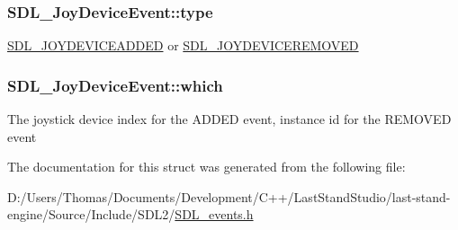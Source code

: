 \subsubsection[{type}]{ S\+D\+L\+\_\+\+Joy\+Device\+Event\+::type}\label{structSDL__JoyDeviceEvent_a51f060ba1dd5669b458e9c97aece667e}
\hyperlink{SDL__events_8h_a3b589e89be6b35c02e0dd34a55f3fccaa0500c4e830a1822e6d0a90294c3f1393}{S\+D\+L\+\_\+\+J\+O\+Y\+D\+E\+V\+I\+C\+E\+A\+D\+D\+E\+D} or \hyperlink{SDL__events_8h_a3b589e89be6b35c02e0dd34a55f3fccaa4e2d7a1067dc56abeee393d46309ecd0}{S\+D\+L\+\_\+\+J\+O\+Y\+D\+E\+V\+I\+C\+E\+R\+E\+M\+O\+V\+E\+D} \hypertarget{structSDL__JoyDeviceEvent_af9b295798f033b799ebbda7de6cb5a7e}{}
\subsubsection[{which}]{ S\+D\+L\+\_\+\+Joy\+Device\+Event\+::which}\label{structSDL__JoyDeviceEvent_af9b295798f033b799ebbda7de6cb5a7e}
The joystick device index for the A\+D\+D\+E\+D event, instance id for the R\+E\+M\+O\+V\+E\+D event 

The documentation for this struct was generated from the following file\+:\begin{DoxyCompactItemize}
\item 
D\+:/\+Users/\+Thomas/\+Documents/\+Development/\+C++/\+Last\+Stand\+Studio/last-\/stand-\/engine/\+Source/\+Include/\+S\+D\+L2/\hyperlink{SDL__events_8h}{S\+D\+L\+\_\+events.\+h}\end{DoxyCompactItemize}
